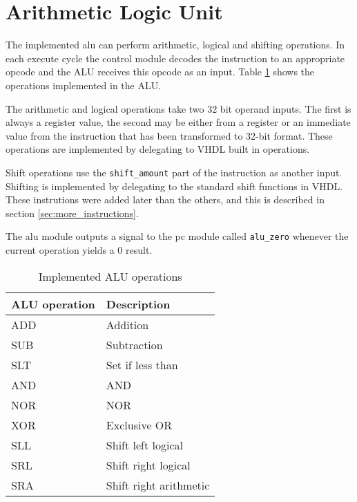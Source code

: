 \section{Arithmetic Logic Unit}
The implemented \gls{alu} can perform arithmetic, logical and shifting operations.
In each execute cycle the control module decodes the instruction to an appropriate opcode and the ALU receives this opcode as an input.
Table \ref{table:alu_ops} shows the operations implemented in the ALU.

The arithmetic and logical operations take two 32 bit operand inputs.
The first is always a register value,
the second may be either from a register or an immediate value from the instruction that has been transformed to 32-bit format.
These operations are implemented by delegating to VHDL built in operations.

Shift operations use the \texttt{shift\_amount} part of the instruction as another input.
Shifting is implemented by delegating to the standard shift functions in VHDL.
These instrutions were added later than the others,
and this is described in section \ref{sec:more_instructions}.

The \gls{alu} module outputs a signal to the \gls{pc} module called \texttt{alu\_zero} whenever the current operation yields a 0 result.

\begin{table}[h]
    \centering
    \begin{tabular}{ |l|l| }
        \hline
        ALU operation & Description             \\ \hline
        ADD           & Addition                \\
        SUB           & Subtraction             \\
        SLT           & Set if less than        \\
        AND           & AND                     \\
        NOR           & NOR                     \\
        XOR           & Exclusive OR            \\
        SLL           & Shift left logical      \\
        SRL           & Shift right logical     \\
        SRA           & Shift right arithmetic  \\
        \hline
    \end{tabular}
    \caption{Implemented ALU operations}
    \label{table:alu_ops}
\end{table}

